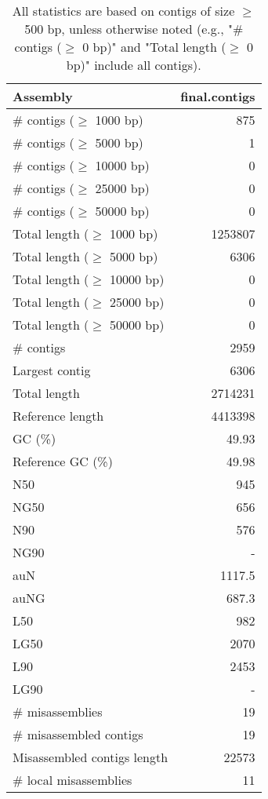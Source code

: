 \documentclass[12pt,a4paper]{article}
\begin{document}
\begin{table}[ht]
\begin{center}
\caption{All statistics are based on contigs of size $\geq$ 500 bp, unless otherwise noted (e.g., "\# contigs ($\geq$ 0 bp)" and "Total length ($\geq$ 0 bp)" include all contigs).}
\begin{tabular}{|l*{1}{|r}|}
\hline
Assembly & final.contigs \\ \hline
\# contigs ($\geq$ 1000 bp) & 875 \\ \hline
\# contigs ($\geq$ 5000 bp) & 1 \\ \hline
\# contigs ($\geq$ 10000 bp) & 0 \\ \hline
\# contigs ($\geq$ 25000 bp) & 0 \\ \hline
\# contigs ($\geq$ 50000 bp) & 0 \\ \hline
Total length ($\geq$ 1000 bp) & 1253807 \\ \hline
Total length ($\geq$ 5000 bp) & 6306 \\ \hline
Total length ($\geq$ 10000 bp) & 0 \\ \hline
Total length ($\geq$ 25000 bp) & 0 \\ \hline
Total length ($\geq$ 50000 bp) & 0 \\ \hline
\# contigs & 2959 \\ \hline
Largest contig & 6306 \\ \hline
Total length & 2714231 \\ \hline
Reference length & 4413398 \\ \hline
GC (\%) & 49.93 \\ \hline
Reference GC (\%) & 49.98 \\ \hline
N50 & 945 \\ \hline
NG50 & 656 \\ \hline
N90 & 576 \\ \hline
NG90 & - \\ \hline
auN & 1117.5 \\ \hline
auNG & 687.3 \\ \hline
L50 & 982 \\ \hline
LG50 & 2070 \\ \hline
L90 & 2453 \\ \hline
LG90 & - \\ \hline
\# misassemblies & 19 \\ \hline
\# misassembled contigs & 19 \\ \hline
Misassembled contigs length & 22573 \\ \hline
\# local misassemblies & 11 \\ \hline

\end{tabular}
\end{center}
\end{table}
\end{document}
